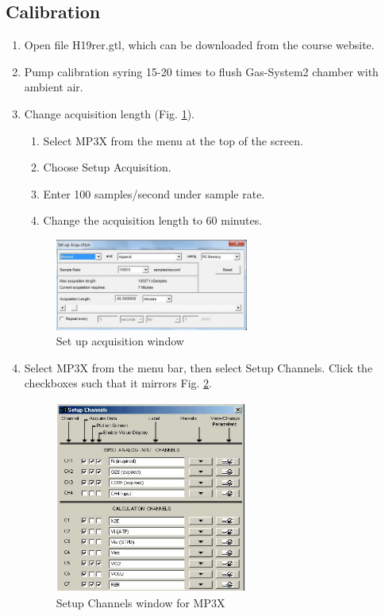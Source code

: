 \documentclass{article}
\begin{document}
\subsection*{Calibration}
\begin{enumerate}
	\item Open file H19rer.gtl, which can be downloaded from the course website.
	\item Pump calibration syring 15-20 times to flush Gas-System2 chamber with ambient air.
	\item Change acquisition length (Fig. \ref{calibration}).\begin{enumerate}
	\item Select MP3X from the menu at the top of the screen.
	\item Choose Setup Acquisition.
	\item Enter 100 samples/second under sample rate.
	\item Change the acquisition length to 60 minutes.
	\end{enumerate}
	\begin{figure}[h]
	\centering\includegraphics[width=0.6\textwidth]{../images/PF_II_4.jpg}
	\caption{Set up acquisition window}
	\label{calibration}
	\end{figure}
	
	\item Select MP3X from the menu bar, then select Setup Channels. Click the checkboxes such that it mirrors Fig. \ref{calibration2}.
	\begin{figure}[h]
	\centering\includegraphics[width=0.6\textwidth]{../images/PF_II_5.jpg}
	\caption{Setup Channels window for MP3X}
	\label{calibration2}
	\end{figure}
	

\end{enumerate}
\end{document}

